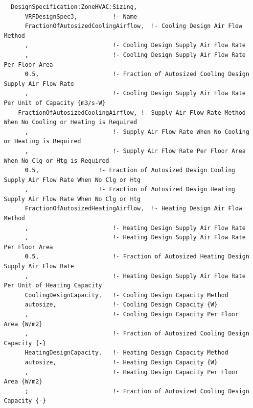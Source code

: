 \begin{lstlisting}
  DesignSpecification:ZoneHVAC:Sizing,
      VRFDesignSpec3,          !- Name
      FractionOfAutosizedCoolingAirflow,  !- Cooling Design Air Flow Method
      ,                        !- Cooling Design Supply Air Flow Rate
      ,                        !- Cooling Design Supply Air Flow Rate Per Floor Area
      0.5,                     !- Fraction of Autosized Cooling Design Supply Air Flow Rate
      ,                        !- Cooling Design Supply Air Flow Rate Per Unit of Capacity {m3/s-W}
    FractionOfAutosizedCoolingAirflow, !- Supply Air Flow Rate Method When No Cooling or Heating is Required
      ,                        !- Supply Air Flow Rate When No Cooling or Heating is Required
      ,                        !- Supply Air Flow Rate Per Floor Area When No Clg or Htg is Required
      0.5,                 !- Fraction of Autosized Design Cooling Supply Air Flow Rate When No Clg or Htg
      ,                    !- Fraction of Autosized Design Heating Supply Air Flow Rate When No Clg or Htg
      FractionOfAutosizedHeatingAirflow,  !- Heating Design Air Flow Method
      ,                        !- Heating Design Supply Air Flow Rate
      ,                        !- Heating Design Supply Air Flow Rate Per Floor Area
      0.5,                     !- Fraction of Autosized Heating Design Supply Air Flow Rate
      ,                        !- Heating Design Supply Air Flow Rate Per Unit of Heating Capacity
      CoolingDesignCapacity,   !- Cooling Design Capacity Method
      autosize,                !- Cooling Design Capacity {W}
      ,                        !- Cooling Design Capacity Per Floor Area {W/m2}
      ,                        !- Fraction of Autosized Cooling Design Capacity {-}
      HeatingDesignCapacity,   !- Heating Design Capacity Method
      autosize,                !- Heating Design Capacity {W}
      ,                        !- Heating Design Capacity Per Floor Area {W/m2}
      ;                        !- Fraction of Autosized Cooling Design Capacity {-}


\end{lstlisting}
